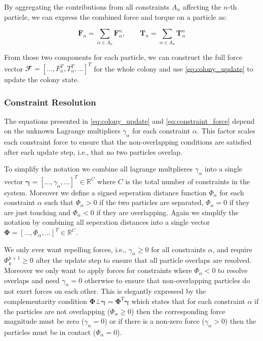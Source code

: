 \documentclass[conference]{IEEEtran}
\begin{document}
By aggregating the contributions from all constraints $A_n$ affecting the $n$-th particle, we can express the combined force and torque on a particle as:

\begin{equation}
    \mathbf{F}_n = \sum_{\alpha \in A_n} \mathbf{F}_\alpha^n, \qquad \mathbf{T}_n = \sum_{\alpha \in A_n} \mathbf{T}_\alpha^n
\end{equation}
\label{eq:total_force}

From those two components for each particle, we can construct the full force vector $\mathbfcal{F} = [ \dots, F_n^T, T_n^T, \dots]^T$ for the whole colony and use \autoref{eq:colony_update} to update the colony state.


\subsubsection{Constraint Resolution}

The equations presented in \autoref{eq:colony_update} and \autoref{eq:constraint_force} depend on the unknown Lagrange multipliers $\gamma_\alpha$ for each constraint $\alpha$. This factor scales each constraint force to ensure that the non-overlapping conditions are satisfied after each update step, i.e., that no two particles overlap.

To simplify the notation we combine all lagrange multplieres $\gamma_\alpha$ into a single vector $\mathbf{\gamma} = [\dots, \gamma_\alpha, \dots]^T \in \mathbb{R}^{C}$ where $C$ is the total number of constraints in the system. Moreover we define a signed seperation distance function $\Phi_{\alpha}$ for each constraint $\alpha$ such that $\Phi_{\alpha} > 0$ if the two particles are separated, $\Phi_{\alpha} = 0$ if they are just touching and $\Phi_{\alpha} < 0$ if they are overlapping. Again we simplify the notation by combining all seperation distances into a single vector $\mathbf{\Phi} = [\dots, \Phi_\alpha, \dots]^T \in \mathbb{R}^{C}$.


We only ever want repelling forces, i.e., $\gamma_\alpha \geq 0$ for all constraints $\alpha$, and require $\Phi_{k}^{k+1} \geq 0$ after the update step to ensure that all particle overlaps are resolved. Moreover we only want to apply forces for constraints where $\Phi_{\alpha} < 0$ to resolve overlaps and need $\gamma_\alpha = 0$ otherwise to ensure that non-overlapping particles do not exert forces on each other. This is elegantly expressed by the complementarity condition $\mathbf{\Phi} \bot \mathbf{\gamma} = \mathbf{\Phi}^T \mathbf{\gamma}$ which states that for each constraint $\alpha$ if the particles are not overlapping ($\Phi_\alpha \geq 0$) then the corresponding force magnitude must be zero ($\gamma_\alpha = 0$) or if there is a non-zero force ($\gamma_\alpha > 0$) then the particles must be in contact ($\Phi_\alpha = 0$).
\end{document}

